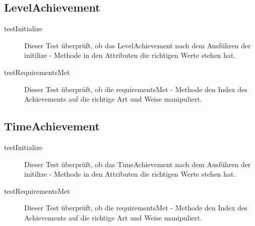 \subsection{LevelAchievement}

\begin{description}
\item[testInitialize]
Dieser Test überprüft, ob das LevelAchievement nach dem Ausführen der initilize - Methode in den Attributen die richtigen Werte stehen hat.

\item[testRequirementsMet]
Dieser Test überprüft, ob die requirementsMet - Methode den Index des Achievements auf die richtige Art und Weise manipuliert.

\end{description}


\subsection{TimeAchievement}

\begin{description}
\item[testInitialize]
Dieser Test überprüft, ob das TimeAchievement nach dem Ausführen der initilize - Methode in den Attributen die richtigen Werte stehen hat.

\item[testRequirementsMet]
Dieser Test überprüft, ob die requirementsMet - Methode den Index des Achievements auf die richtige Art und Weise manipuliert.

\end{description}

